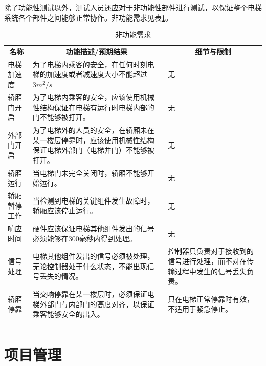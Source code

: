 除了功能性测试以外，测试人员还应对于非功能性部件进行测试，以保证整个电梯系统各个部件之间能够正常协作。非功能需求见表\ref{tab:nonfunction}。
\begin{longtable}{p{} p{} p{}}
	\caption{非功能需求}\\

	\toprule
	\multicolumn{1}{c}{\textbf{名称}} &
	\multicolumn{1}{c}{\textbf{功能描述/预期结果}} &
	\multicolumn{1}{c}{\textbf{细节与限制}} \\
	\cmidrule(lr){1-1} \cmidrule(lr){2-2} \cmidrule(lr){3-3}

	电梯加速度
	& 为了电梯内乘客的安全，在任何时刻电梯的加速度或者减速度大小不能超过$3m^2/s$
	& 无 \\ \cmidrule(lr){1-3}

	轿厢门开启
	& 为了电梯内乘客的安全，应该使用机械性结构保证在电梯有运行时电梯内部的门不能够被打开。
	& 无 \\ \cmidrule(lr){1-3}

	外部门开启
	& 为了电梯外的人员的安全，在轿厢未在某一楼层停靠时，应该使用机械性结构保证电梯外部门（电梯井门）不能够被打开。
	& 无 \\ \cmidrule(lr){1-3}

	轿厢运行
	& 当电梯门未完全关闭时，轿厢不能够开始运行。
	& 无 \\ \cmidrule(lr){1-3}

	轿厢暂停工作
	& 当检测到电梯的关键组件发生故障时，轿厢应该停止运行。
	& 无 \\ \cmidrule(lr){1-3}

	响应时间
	& 硬件应该保证电梯其他组件发出的信号必须能够在300毫秒内得到处理。
	& 无 \\ \cmidrule(lr){1-3}

	信号处理
	& 电梯其他组件发出的信号必须被处理，无论控制器处于什么状态，不能出现信号丢失的情况。
	& 控制器只负责对于接收到的信号进行处理，而不对在传输过程中发生的信号丢失负责。 \\ \cmidrule(lr){1-3}

	轿厢停靠
	& 当交响停靠在某一楼层时，必须保证电梯外部门与内部门的高度对齐，以保证乘客能够安全的出入。
	& 只在电梯正常停靠时有效，不适用于紧急停止。 \\

	\bottomrule
	\label{tab:nonfunction}
\end{longtable}

\newpage
\section{项目管理}
